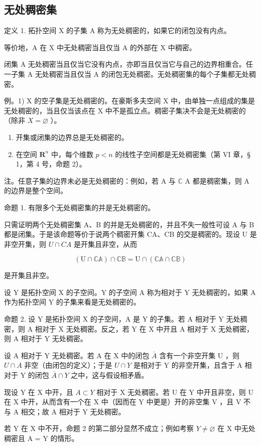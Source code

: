 \subsection{无处稠密集}

定义 1. 拓扑空间 X 的子集 A 称为无处稠密的，如果它的闭包没有内点。

等价地，A 在 X 中无处稠密当且仅当 A 的外部在 X 中稠密。

闭集 A 无处稠密当且仅当它没有内点，亦即当且仅当它与自己的边界相重合。任一子集 A 无处稠密当且仅当 A 的闭包无处稠密。无处稠密集的每个子集都无处稠密。

例。1) X 的空子集是无处稠密的。在豪斯多夫空间 X 中，由单独一点组成的集是无处稠密的，当且仅当该点在 X 中不是孤立点。稠密子集决不会是无处稠密的（除非 \(X = \varnothing\) ）。

\begin{enumerate}
\def\labelenumi{\arabic{enumi})}
\setcounter{enumi}{1}
\item
开集或闭集的边界总是无处稠密的。
\item
在空间 \(\mathbf{R}^n\) 中，每个维数 \(p < n\) 的线性子空间都是无处稠密集（第 VI 章，§ 1，第 4 号，命题 2）。
\end{enumerate}

注。任意子集的边界未必是无处稠密的：例如，若 A 与 \(\mathbb{C}\) A 都是稠密集，则 A 的边界是整个空间。

命题 1. 有限多个无处稠密集的并是无处稠密的。

只需证明两个无处稠密集 A、B 的并是无处稠密的，并且不失一般性可设 A 与 B 都是闭集。于是该命题等价于说两个稠密开集 CA、CB 的交是稠密的。现设 U 是非空开集，则 \(U \cap CA\) 是开集且非空，从而

\[
\left(\mathrm{U} \cap \mathbb {C A}\right) \cap \mathbb {C B} = \mathrm{U} \cap \left(\mathbb {C A} \cap \mathbb {C B}\right)
\]

是开集且非空。

设 Y 是拓扑空间 X 的子空间。Y 的子空间 A 称为相对于 Y 无处稠密的，如果 A 作为拓扑空间 Y 的子集来看是无处稠密的。

命题 2. 设 Y 是拓扑空间 X 的子空间，A 是 Y 的子集。若 A 相对于 Y 无处稠密，则 A 相对于 X 无处稠密。反之，若 Y 在 X 中开且 A 相对于 X 无处稠密，则 A 相对于 Y 无处稠密。

设 A 相对于 Y 无处稠密。若 A 在 X 中的闭包 \(\overline{A}\) 含有一个非空开集 U ，则 \(U \cap A\) 非空（由闭包的定义）；于是 \(U \cap Y\) 是相对于 Y 的非空开集，且含于 A 相对于 Y 的闭包 \(\overline{A} \cap Y\) 之中，这与假设相矛盾。

现设 Y 在 X 中开，且 \(A \subset Y\) 相对于 X 无处稠密。若 U 在 Y 中开且非空，则 U 在 X 中开，从而含有一个在 X 中（因而在 Y 中更是）开的非空集 V ，且 V 不与 A 相交；故 A 相对于 Y 无处稠密。

若 Y 在 X 中不开，命题 2 的第二部分显然不成立；例如考察 \(Y \neq \varnothing\) 在 X 中无处稠密且 A = Y 的情形。

